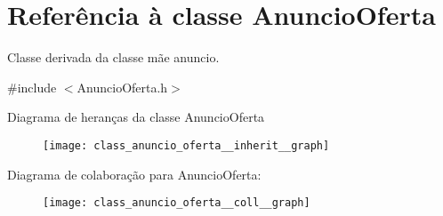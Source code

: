 \hypertarget{class_anuncio_oferta}{\section{Referência à classe Anuncio\+Oferta}
\label{class_anuncio_oferta}
}


Classe derivada da classe mãe anuncio.  




{\ttfamily \#include $<$Anuncio\+Oferta.\+h$>$}



Diagrama de heranças da classe Anuncio\+Oferta\nopagebreak
\begin{figure}[H]
\begin{center}
\leavevmode
\texttt{[image: class\_anuncio\_oferta\_\_inherit\_\_graph]}
\end{center}
\end{figure}


Diagrama de colaboração para Anuncio\+Oferta\+:\nopagebreak
\begin{figure}[H]
\begin{center}
\leavevmode
\texttt{[image: class\_anuncio\_oferta\_\_coll\_\_graph]}
\end{center}
\end{figure}
